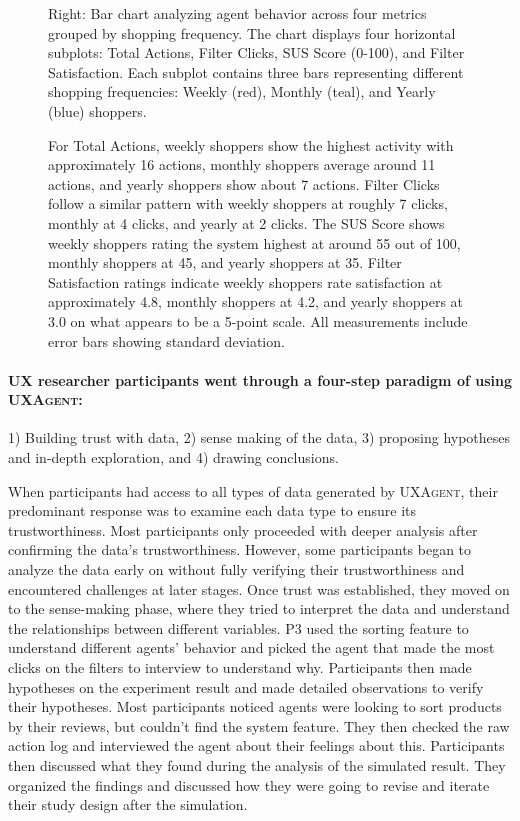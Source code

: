 \documentclass[manuscript,review,anonymous]{acmart}
\DeclareRobustCommand{\projectname}{\textsc{UXAgent}\xspace}
\begin{document}
\begin{figure}[t]
{Right: Bar chart analyzing agent behavior across four metrics grouped by shopping frequency. The chart displays four horizontal subplots: Total Actions, Filter Clicks, SUS Score (0-100), and Filter Satisfaction. Each subplot contains three bars representing different shopping frequencies: Weekly (red), Monthly (teal), and Yearly (blue) shoppers.

For Total Actions, weekly shoppers show the highest activity with approximately 16 actions, monthly shoppers average around 11 actions, and yearly shoppers show about 7 actions. Filter Clicks follow a similar pattern with weekly shoppers at roughly 7 clicks, monthly at 4 clicks, and yearly at 2 clicks. The SUS Score shows weekly shoppers rating the system highest at around 55 out of 100, monthly shoppers at 45, and yearly shoppers at 35. Filter Satisfaction ratings indicate weekly shoppers rate satisfaction at approximately 4.8, monthly shoppers at 4.2, and yearly shoppers at 3.0 on what appears to be a 5-point scale. All measurements include error bars showing standard deviation.
}
\end{figure}

\paragraph{\textbf{UX researcher participants went through a four-step paradigm of using \projectname:}} 1) Building trust with data, 2) sense making of the data, 3) proposing hypotheses and in-depth exploration, and 4) drawing conclusions.

When participants had access to all types of data generated by \projectname, their predominant response was to examine each data type to ensure its trustworthiness. 
Most participants only proceeded with deeper analysis after confirming the data's trustworthiness. However, some participants began to analyze the data early on without fully verifying their trustworthiness and encountered challenges at later stages.
Once trust was established, they moved on to the sense-making phase, where they tried to interpret the data and understand the relationships between different variables.
P3 used the sorting feature to understand different agents' behavior and picked the agent that made the most clicks on the filters to interview to understand why.
Participants then made hypotheses on the experiment result and made detailed observations to verify their hypotheses.
Most participants noticed agents were looking to sort products by their reviews, but couldn't find the system feature. 
They then checked the raw action log and interviewed the agent about their feelings about this.
Participants then discussed what they found during the analysis of the simulated result.
They organized the findings and discussed how they were going to revise and iterate their study design after the simulation.
\end{document}
